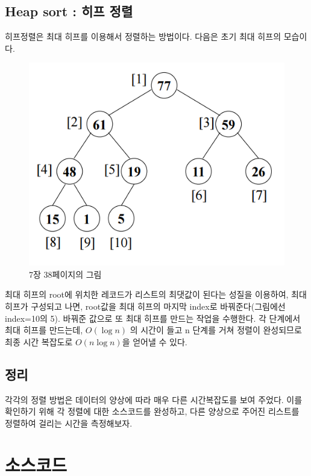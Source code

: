 \documentclass{article}
\begin{document}
\subsection{Heap sort : 히프 정렬}
히프정렬은 최대 히프를 이용해서 정렬하는 방법이다.
다음은 초기 최대 히프의 모습이다.
\begin{figure}[H]\centering
\includegraphics[width=.9\linewidth]{heap.PNG}
\caption*{7장 38페이지의 그림}
\end{figure}
최대 히프의 root에 위치한 레코드가 리스트의 최댓값이 된다는 성질을 이용하여, 최대 히프가 구성되고 나면, root값을 최대 히프의 마지막 index로 바꿔준다(그림에선 index=10의 5). 바꿔준 값으로 또 최대 히프를 만드는 작업을 수행한다. 각 단계에서 최대 히프를 만드는데, $O(\log n)$ 의 시간이 들고 n 단계를 거쳐 정렬이 완성되므로 최종 시간 복잡도로 $O(n\log n)$을 얻어낼 수 있다.
\subsection{정리}
각각의 정렬 방법은 데이터의 양상에 따라 매우 다른 시간복잡도를 보여 주었다. 이를 확인하기 위해 각 정렬에 대한 소스코드를 완성하고, 다른 양상으로 주어진 리스트를 정렬하여 걸리는 시간을 측정해보자.
\pagebreak

\section{소스코드}
\end{document}
